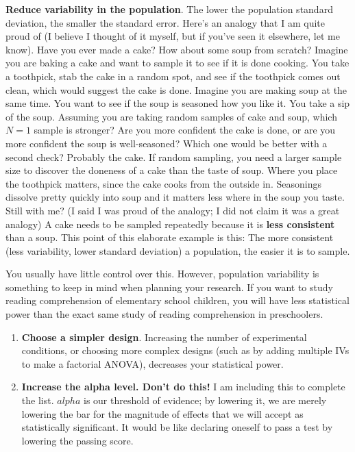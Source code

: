 \documentclass[
]{book}
\begin{document}
\begin{enumerate}
  \textbf{Reduce variability in the population}. The lower the population standard deviation, the smaller the standard error. Here's an analogy that I am quite proud of (I believe I thought of it myself, but if you've seen it elsewhere, let me know). Have you ever made a cake? How about some soup from scratch? Imagine you are baking a cake and want to sample it to see if it is done cooking. You take a toothpick, stab the cake in a random spot, and see if the toothpick comes out clean, which would suggest the cake is done. Imagine you are making soup at the same time. You want to see if the soup is seasoned how you like it. You take a sip of the soup. Assuming you are taking random samples of cake and soup, which \(N = 1\) sample is stronger? Are you more confident the cake is done, or are you more confident the soup is well-seasoned? Which one would be better with a second check? Probably the cake. If random sampling, you need a larger sample size to discover the doneness of a cake than the taste of soup. Where you place the toothpick matters, since the cake cooks from the outside in. Seasonings dissolve pretty quickly into soup and it matters less where in the soup you taste. Still with me? (I said I was proud of the analogy; I did not claim it was a great analogy) A cake needs to be sampled repeatedly because it is \textbf{less consistent} than a soup. This point of this elaborate example is this: The more consistent (less variability, lower standard deviation) a population, the easier it is to sample.
\end{enumerate}

You usually have little control over this. However, population variability is something to keep in mind when planning your research. If you want to study reading comprehension of elementary school children, you will have less statistical power than the exact same study of reading comprehension in preschoolers.

\begin{enumerate}
\def\labelenumi{\arabic{enumi}.}
\setcounter{enumi}{4}
\item
  \textbf{Choose a simpler design}. Increasing the number of experimental conditions, or choosing more complex designs (such as by adding multiple IVs to make a factorial ANOVA), decreases your statistical power.
\item
  \textbf{Increase the alpha level. Don't do this!} I am including this to complete the list. \(alpha\) is our threshold of evidence; by lowering it, we are merely lowering the bar for the magnitude of effects that we will accept as statistically significant. It would be like declaring oneself to pass a test by lowering the passing score.
\end{enumerate}
\end{document}
